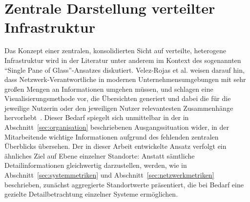 \section{Zentrale Darstellung verteilter Infrastruktur}
\label{sec:related-spog}

Das Konzept einer zentralen, konsolidierten Sicht auf verteilte, heterogene
Infrastruktur wird in der Literatur unter anderem im Kontext des sogenannten
\enquote{Single Pane of Glass}-Ansatzes diskutiert. Velez-Rojas et al. weisen darauf
hin, dass Netzwerk-Verantwortliche in modernen Unternehmensumgebungen mit sehr
großen Mengen an Informationen umgehen müssen, und schlagen eine Visualisierungsmethode
vor, die Übersichten generiert und dabei die für die jeweilige Nutzerin oder den
jeweiligen Nutzer relevantesten Zusammenhänge hervorhebt~\cite{VelezRojas2013}. Dieser
Bedarf spiegelt sich unmittelbar in der in Abschnitt~\ref{sec:organisation}
beschriebenen Ausgangssituation wider, in der Mitarbeitende wichtige Informationen
aufgrund des fehlenden zentralen Überblicks übersehen. Der in dieser Arbeit entwickelte
Ansatz verfolgt ein ähnliches Ziel auf Ebene einzelner Standorte: Anstatt sämtliche
Detailinformationen gleichwertig darzustellen, werden, wie in
Abschnitt~\ref{sec:systemmetriken} und Abschnitt~\ref{sec:netzwerkmetriken}
beschrieben, zunächst aggregierte Standortwerte präsentiert, die bei Bedarf eine
gezielte Detailbetrachtung einzelner Systeme ermöglichen.